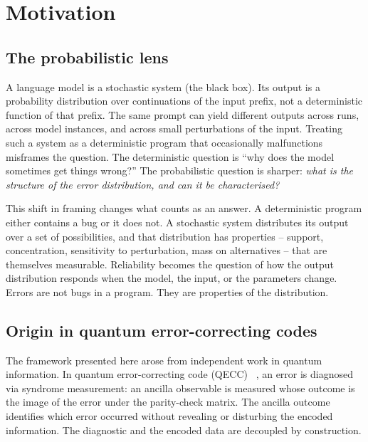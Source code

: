 \documentclass[11pt,a4paper]{article}
\begin{document}
\section{Motivation}
\label{sec:motivation}

\subsection{The probabilistic lens}
\label{sec:mot-prob}

A language model is a stochastic system (the black box). Its output is a probability distribution over continuations of the input prefix, not a deterministic function of that prefix. The same prompt can yield different outputs across runs, across model instances, and across small perturbations of the input. Treating such a system as a deterministic program that occasionally malfunctions misframes the question. The deterministic question is ``why does the model sometimes get things wrong?'' The probabilistic question is sharper: \emph{what is the structure of the error distribution, and can it be characterised?}

This shift in framing changes what counts as an answer. A deterministic program either contains a bug or it does not. A stochastic system distributes its output over a set of possibilities, and that distribution has properties -- support, concentration, sensitivity to perturbation, mass on alternatives -- that are themselves measurable. Reliability becomes the question of how the output distribution responds when the model, the input, or the parameters change. Errors are not bugs in a program. They are properties of the distribution.


\subsection{Origin in quantum error-correcting codes}
\label{sec:mot-qecc}

The framework presented here arose from independent work in quantum information. In quantum error-correcting code (QECC)~\cite{NielsenChuang2000, Laflamme1996, Bennett1996} , an error is diagnosed via syndrome measurement: an ancilla observable is measured whose outcome is the image of the error under the parity-check matrix. The ancilla outcome identifies which error occurred without revealing or disturbing the encoded information. The diagnostic and the encoded data are decoupled by construction.
\end{document}
